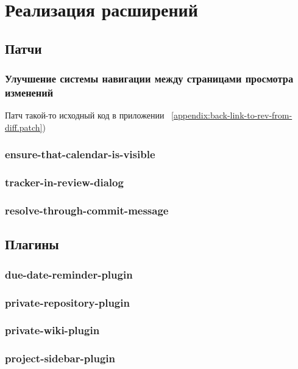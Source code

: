 \chapter{Реализация расширений}

\section{Патчи}
\subsection{Улучшение системы навигации между страницами просмотра изменений}
Патч такой-то исходный код в приложении
~\ref{appendix:back-link-to-rev-from-diff.patch})

\subsection{ensure-that-calendar-is-visible}
\subsection{tracker-in-review-dialog}
\subsection{resolve-through-commit-message}

\section{Плагины}
\subsection{due-date-reminder-plugin}
\subsection{private-repository-plugin}
\subsection{private-wiki-plugin}
\subsection{project-sidebar-plugin}






